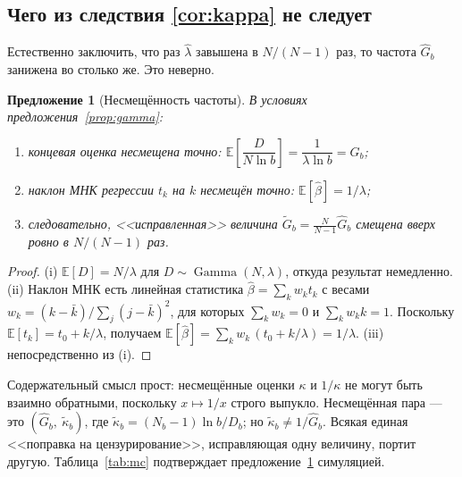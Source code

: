 \documentclass[11pt,a4paper]{article}
\theoremstyle{plain}
\newtheorem{proposition}{Предложение}
\theoremstyle{remark}
\DeclareMathOperator{\Gam}{Gamma}
\begin{document}
\subsection{Чего из следствия \ref{cor:kappa} не следует}

Естественно заключить, что раз $\hat\lambda$ завышена в $N/(N-1)$ раз, то частота
$\hat G_b$ занижена во столько же. Это неверно.

\begin{proposition}[Несмещённость частоты]\label{prop:unbiased}
В условиях предложения~\ref{prop:gamma}:
\begin{enumerate}
\item[\rm(i)] концевая оценка несмещена точно:
$\mathbb E\!\left[\dfrac{D}{N\ln b}\right]=\dfrac{1}{\lambda\ln b}=G_b$;
\item[\rm(ii)] наклон МНК регрессии $t_k$ на $k$ несмещён точно:
$\mathbb E[\hat\beta]=1/\lambda$;
\item[\rm(iii)] следовательно, <<исправленная>> величина
$\tilde G_b=\frac{N}{N-1}\hat G_b$ смещена \emph{вверх} ровно в $N/(N-1)$ раз.
\end{enumerate}
\end{proposition}

\begin{proof}
(i) $\mathbb E[D]=N/\lambda$ для $D\sim\Gam(N,\lambda)$, откуда результат немедленно.
(ii) Наклон МНК есть линейная статистика $\hat\beta=\sum_k w_k t_k$ с весами
$w_k=(k-\bar k)/\sum_j(j-\bar k)^2$, для которых $\sum_k w_k=0$ и $\sum_k w_k k=1$.
Поскольку $\mathbb E[t_k]=t_0+k/\lambda$, получаем
$\mathbb E[\hat\beta]=\sum_k w_k\,(t_0+k/\lambda)=1/\lambda$.
(iii) непосредственно из (i).
\end{proof}

Содержательный смысл прост: несмещённые оценки $\kappa$ и $1/\kappa$ не могут быть
взаимно обратными, поскольку $x\mapsto1/x$ строго выпукло. Несмещённая пара --- это
$(\hat G_b,\ \tilde\kappa_b)$, где $\tilde\kappa_b=(N_b-1)\ln b/D_b$; но
$\tilde\kappa_b\ne1/\hat G_b$. Всякая единая <<поправка на цензурирование>>,
исправляющая одну величину, портит другую. Таблица~\ref{tab:mc} подтверждает
предложение~\ref{prop:unbiased} симуляцией.
\end{document}
